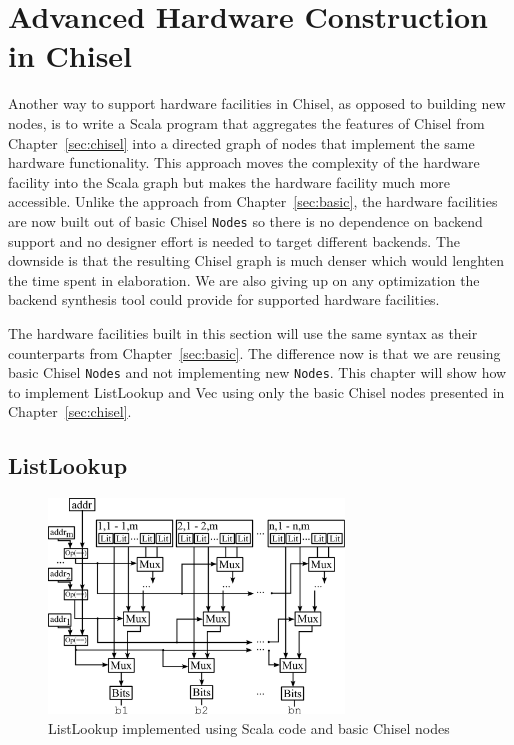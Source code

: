 \section{Advanced Hardware Construction in Chisel}
\label{sec:advanced}
Another way to support hardware facilities in Chisel, as opposed to
building new nodes, is to write a Scala program that aggregates the
features of Chisel from Chapter~\ref{sec:chisel} into a directed graph
of nodes that implement the same hardware functionality. This approach
moves the complexity of the hardware facility into the Scala graph but
makes the hardware facility much more accessible.
Unlike the approach from Chapter~\ref{sec:basic}, the
hardware facilities are now built out of basic Chisel {\tt Nodes} so
there is no dependence on backend support and no designer effort is
needed to target different backends. The downside is that the
resulting Chisel graph is much denser which would lenghten the time
spent in elaboration. We are also giving up on any optimization the
backend synthesis tool could provide for supported hardware facilities.

The hardware facilities built in this section will use the same syntax
as their counterparts from Chapter~\ref{sec:basic}. The difference now
is that we are reusing basic Chisel {\tt Nodes} and not implementing
new {\tt Nodes}. This chapter will show how to implement ListLookup
and Vec using only the basic Chisel nodes presented in
Chapter~\ref{sec:chisel}.

\subsection{ListLookup}
\begin{figure}[htb]
\centering
\includegraphics[width=0.7\textwidth]{figures/listlookupscala.pdf}
\caption{ListLookup implemented using Scala code and basic Chisel nodes}
\label{fig:llscala}
\end{figure}

